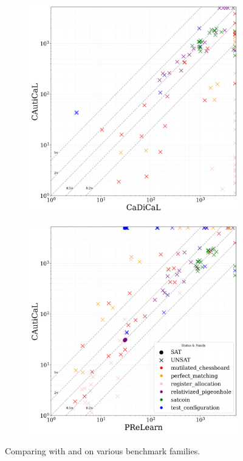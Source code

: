 \begin{figure}[!h]
    \centering
    \begin{subfigure}[t]{0.45\textwidth}
            \centering
            \includegraphics[width=\textwidth]{figs/cadical_vs_cautical_interesting.jpg}
            \label{fig:cautical-vs-cadical}
    \end{subfigure}
    \begin{subfigure}[t]{0.45\textwidth}
        \centering
        \includegraphics[width=\textwidth]{figs/prelearn_vs_cautical_interesting_legend.jpg}
        \label{fig:cautical-vs-prelearn}
    \end{subfigure}

    \caption{Comparing \tool with \cadical and \prelearn on various benchmark families.}
    \label{fig:solver-comparison-familis}
\end{figure}

